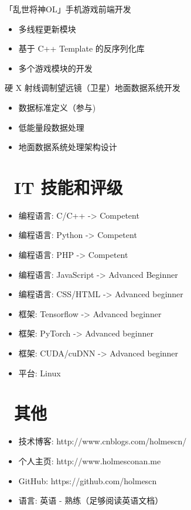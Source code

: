 \documentclass{resume}
\begin{document}
\begin{onehalfspacing}
「乱世将神OL」手机游戏前端开发
\begin{itemize}
  \item 多线程更新模块
  \item 基于 C++ Template 的反序列化库
  \item 多个游戏模块的开发
\end{itemize}
\end{onehalfspacing}

硬 X 射线调制望远镜（卫星）地面数据系统开发
\begin{itemize}
  \item 数据标准定义（参与)
  \item 低能量段数据处理
  \item 地面数据系统处理架构设计
\end{itemize}

\section{\faCogs\ IT 技能和评级}
\begin{itemize}[parsep=0.5ex]
  \item 编程语言: C/C++ -> Competent
  \item 编程语言: Python -> Competent
  \item 编程语言: PHP -> Competent
  \item 编程语言: JavaScript -> Advanced Beginner
  \item 编程语言: CSS/HTML -> Advanced beginner
  \item 框架: Tensorflow -> Advanced beginner
  \item 框架: PyTorch -> Advanced beginner
  \item 框架: CUDA/cuDNN -> Advanced beginner
  \item 平台: Linux
\end{itemize}

\section{\faInfo\ 其他}
\begin{itemize}[parsep=0.5ex]
  \item 技术博客: http://www.cnblogs.com/holmescn/
  \item 个人主页: http://www.holmesconan.me
  \item GitHub: https://github.com/holmescn
  \item 语言: 英语 - 熟练（足够阅读英语文档）
\end{itemize}
\end{document}
